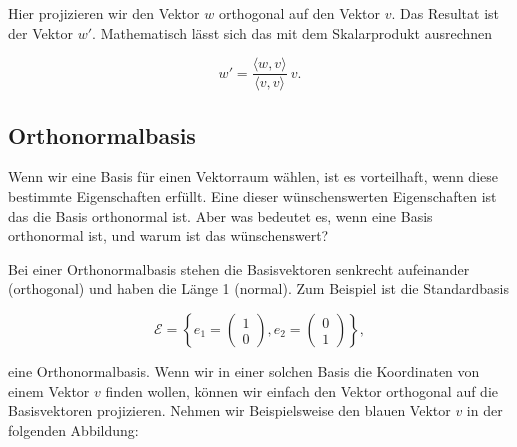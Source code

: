 Hier projizieren wir den Vektor \( w \) orthogonal auf den Vektor \( v \). Das Resultat ist der Vektor \( w' \). Mathematisch lässt sich das mit dem Skalarprodukt ausrechnen 

\begin{equation*}
    w' = \frac{\langle w, v \rangle}{\langle v, v \rangle} \ v. 
\end{equation*}

\subsection{Orthonormalbasis}

Wenn wir eine Basis für einen Vektorraum wählen, ist es vorteilhaft, wenn diese bestimmte Eigenschaften erfüllt. Eine dieser wünschenswerten Eigenschaften ist das die Basis orthonormal ist. Aber was bedeutet es, wenn eine Basis orthonormal ist, und warum ist das wünschenswert?

\vspace{1\baselineskip}

Bei einer Orthonormalbasis stehen die Basisvektoren senkrecht aufeinander (orthogonal) und haben die Länge 1 (normal). Zum Beispiel ist die Standardbasis

\begin{equation*}
    \mathcal{E} = \left\{
    e_1 =\begin{pmatrix}
        1 \\ 0
    \end{pmatrix},
    e_2 = \begin{pmatrix}
        0 \\ 1
    \end{pmatrix} \right\}, 
\end{equation*}

\vspace{0.25\baselineskip}

eine Orthonormalbasis. Wenn wir in einer solchen Basis die Koordinaten von einem Vektor \( v \) finden wollen, können wir einfach den Vektor orthogonal auf die Basisvektoren projizieren. Nehmen wir Beispielsweise den blauen Vektor \( v \) in der folgenden Abbildung:

